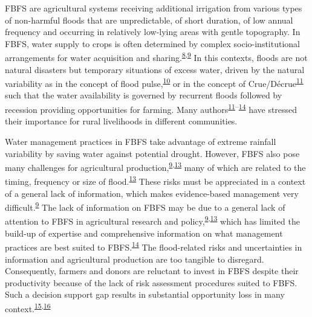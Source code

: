 \documentclass[12pt,oneside]{article}
\begin{document}
FBFS are agricultural systems receiving additional irrigation from
various types of non-harmful floods that are unpredictable, of short
duration, of low annual frequency and occurring in relatively low-lying
areas with gentle topography. In FBFS, water supply to crops is often
determined by complex socio-institutional arrangements for water
acquisition and
sharing.\textsuperscript{\protect\hyperlink{ref-Haile_2010}{8},\protect\hyperlink{ref-VanSteenbergen_et_al_2010}{9}}
In this contexts, floods are not natural disasters but temporary
situations of excess water, driven by the natural variability as in the
concept of flood
pulse,\textsuperscript{\protect\hyperlink{ref-Junk_et_al_1989}{10}} or
in the concept of
Crue/Décrue\textsuperscript{\protect\hyperlink{ref-Harlan_Pasquereau_1969}{11}}
such that the water availability is governed by recurrent floods
followed by recession providing opportunities for farming. Many
authors\textsuperscript{\protect\hyperlink{ref-Harlan_Pasquereau_1969}{11}--\protect\hyperlink{ref-VanSteenbergen_et_al_2011}{14}}
have stressed their importance for rural livelihoods in different
communities.

Water management practices in FBFS take advantage of extreme rainfall
variability by saving water against potential drought. However, FBFS
also pose many challenges for agricultural
production,\textsuperscript{\protect\hyperlink{ref-VanSteenbergen_et_al_2010}{9},\protect\hyperlink{ref-Puertas_et_al_2011}{13}}
many of which are related to the timing, frequency or size of
flood.\textsuperscript{\protect\hyperlink{ref-Puertas_et_al_2011}{13}}
These risks must be appreciated in a context of a general lack of
information, which makes evidence-based management very
difficult.\textsuperscript{\protect\hyperlink{ref-VanSteenbergen_et_al_2010}{9}}
The lack of information on FBFS may be due to a general lack of
attention to FBFS in agricultural research and
policy,\textsuperscript{\protect\hyperlink{ref-VanSteenbergen_et_al_2010}{9},\protect\hyperlink{ref-Puertas_et_al_2011}{13}}
which has limited the build-up of expertise and comprehensive
information on what management practices are best suited to
FBFS.\textsuperscript{\protect\hyperlink{ref-VanSteenbergen_et_al_2011}{14}}
The flood-related risks and uncertainties in information and
agricultural production are too tangible to disregard. Consequently,
farmers and donors are reluctant to invest in FBFS despite their
productivity because of the lack of risk assessment procedures suited to
FBFS. Such a decision support gap results in substantial opportunity
loss in many
context.\textsuperscript{\protect\hyperlink{ref-Erkossa_et_al_2014}{15},\protect\hyperlink{ref-Hardaker_et_al_2015}{16}}
\end{document}
